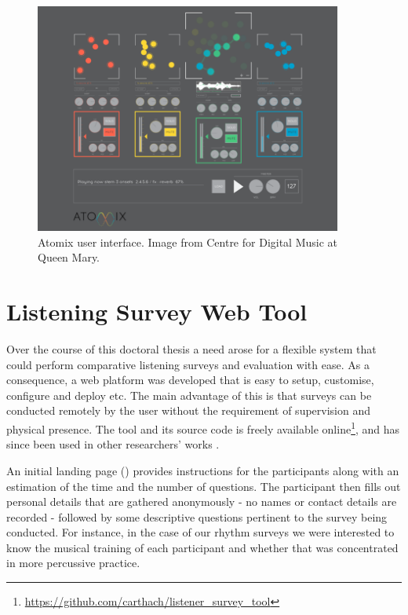 \begin{figure}
	\begin{center}
		\includegraphics[width=0.9\textwidth]{ch99/figures/atomix.png}
	\end{center}
	\caption[Atomix user interface]{Atomix user interface. Image from Centre for Digital Music at Queen Mary.}
	\label{fig:atomix}
\end{figure}

\chapter{Listening Survey Web Tool}
\label{app:listening_survey}

Over the course of this doctoral thesis a need arose for a flexible system that could perform comparative listening surveys and evaluation with ease. As a consequence, a web platform was developed that is easy to setup, customise, configure and deploy etc. The main advantage of this is that surveys can be conducted remotely by the user without the requirement of supervision and physical presence. The tool and its source code is freely available online\footnote{\url{https://github.com/carthach/listener_survey_tool}}, and has since been used in other researchers' works \citep{Marti2015, Jade2016}.

An initial landing page () provides instructions for the participants along with an estimation of the time and the number of questions. The participant then fills out personal details that are gathered anonymously - no names or contact details are recorded - followed by some descriptive questions pertinent to the survey being conducted. For instance, in the case of our rhythm surveys we were interested to know the musical training of each participant and whether that was concentrated in more percussive practice.  

